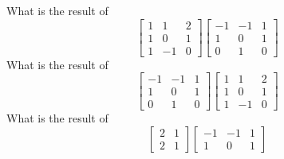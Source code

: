 \bexo
What is the result of 
\begin{equation*}
\left[
\begin{array}{ccc}
1 & 1 & 2\\
1 & 0 & 1\\
1 & -1 & 0
\end{array}
\right]
\left[
\begin{array}{ccc}
-1 & -1 & 1\\
1 & 0 & 1\\
0 & 1 & 0
\end{array}
\right]
\end{equation*}
\eexo
{}
\bexo
What is the result of 
\begin{equation*}
\left[
\begin{array}{ccc}
-1 & -1 & 1\\
1 & 0 & 1\\
0 & 1 & 0
\end{array}
\right]
\left[
\begin{array}{ccc}
1 & 1 & 2\\
1 & 0 & 1\\
1 & -1 & 0
\end{array}
\right]
\end{equation*}
\eexo
{}
\bexo
What is the result of 
\begin{equation*}
\left[
\begin{array}{cc}
2 & 1\\
2 & 1
\end{array}
\right]
\left[
\begin{array}{ccc}
-1 & -1 & 1\\
1 & 0 & 1
\end{array}
\right]
\end{equation*}
\eexo
